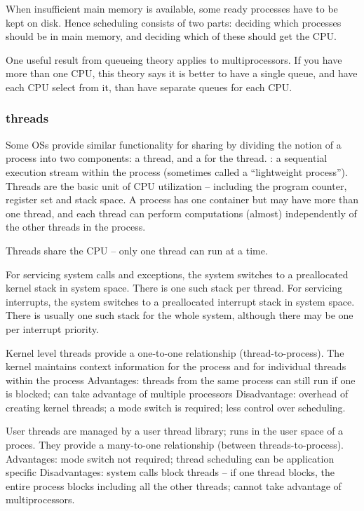 \begin{compactitem}
\begin{compactitem}
\begin{compactitem}
When insufficient main memory is available, some ready processes have to
be kept on disk. Hence scheduling consists of two parts:
deciding which processes should be in main memory, and
deciding which of these should get the CPU.

One useful result from queueing theory applies to multiprocessors. If you
have more than one CPU, this theory says it is better to have a single
queue, and have each CPU select from it, than have separate queues for
each CPU.

\subsubsection{threads}
Some OSs provide similar functionality for sharing by dividing the notion of
a process into two components: a thread, and a  for the thread.
: a sequential execution stream within the process
(sometimes called a “lightweight process”). Threads are the basic unit of
CPU utilization – including the program counter, register set and stack
space.
A process has one container but may have more than one thread, and each
thread can perform computations (almost) independently of the other
threads in the process.

Threads share the CPU – only one thread can run at a time.

For servicing system calls and exceptions, the system switches to a
preallocated kernel stack in system space. There is one such stack per
thread.
For servicing interrupts, the system switches to a preallocated interrupt
stack in system space. There is usually one such stack for the whole
system, although there may be one per interrupt priority.

Kernel level threads provide a one-to-one relationship (thread-to-process).
The kernel maintains context information for the process and for individual
threads within the process
Advantages: threads from the same process can still run if one is blocked;
can take advantage of multiple processors
Disadvantage: overhead of creating kernel threads; a mode switch is
required; less control over scheduling.

User threads are managed by a user thread library; runs in the user space
of a proces. They provide a many-to-one relationship (between
threads-to-process).
Advantages: mode switch not required; thread scheduling can be
application specific
Disadvantages: system calls block threads – if one thread blocks, the
entire process blocks including all the other threads; cannot take
advantage of multiprocessors.



\end{compactitem}
\end{compactitem}
\end{compactitem}
